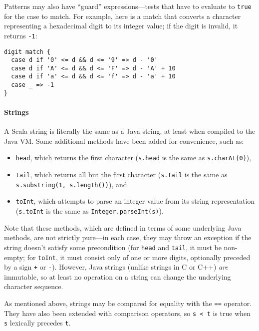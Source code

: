 Patterns may also have ``guard'' expressions---tests that have to evaluate to \verb|true| for the case to match. For example, here is a match that converts a character representing a hexadecimal digit to its integer value; if the digit is invalid, it returns \verb|-1|:
\begin{verbatim}
digit match {
  case d if '0' <= d && d <= '9' => d - '0'
  case d if 'A' <= d && d <= 'F' => d - 'A' + 10
  case d if 'a' <= d && d <= 'f' => d - 'a' + 10
  case _ => -1
}
\end{verbatim}

\paragraph{Strings}
A Scala string is literally the same as a Java string, at least when compiled to the Java VM. Some additional methods have been added for convenience, such as:
\begin{itemize}
\item \verb|head|, which returns the first character (\verb|s.head| is the same as \verb|s.charAt(0)|),
\item \verb|tail|, which returns all but the first character (\verb|s.tail| is the same as \verb|s.substring(1, s.length())|), and
\item \verb|toInt|, which attempts to parse an integer value from its string representation (\verb|s.toInt| is the same as \verb|Integer.parseInt(s)|).
\end{itemize}
Note that these methods, which are defined in terms of some underlying Java methods, are not strictly pure---in each case, they may throw an exception if the string doesn't satisfy some precondition (for \verb|head| and \verb|tail|, it must be non-empty; for \verb|toInt|, it must consist only of one or more digits, optionally preceded by a sign \verb|+| or \verb|-|). However, Java strings (unlike strings in C or C++) \emph{are} immutable, so at least no operation on a string can change the underlying character sequence.

As mentioned above, strings may be compared for equality with the \verb|==| operator. They have also been extended with comparison operators, so \verb|s < t| is true when \verb|s| lexically precedes \verb|t|.

